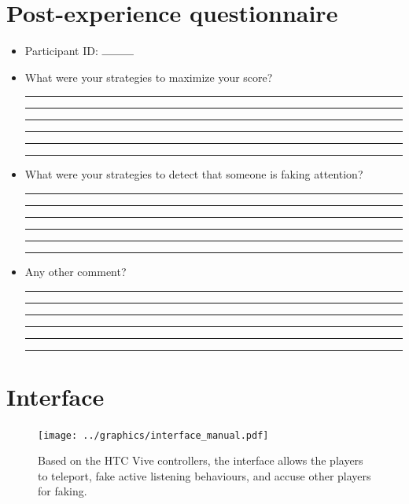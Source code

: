 \documentclass[]{simple-thesis}
\begin{document}
\begin{appendices}
\begin{itemize}
\end{itemize}


\chapter{Post-experience questionnaire}\label{appendix:questionnaire:post}

\begin{itemize}

\item Participant ID: $\rule{1cm}{0.1mm}$

\item What were your strategies to maximize your score?

  \rule{\linewidth}{0.1mm}
  \rule{\linewidth}{0.1mm}
  \rule{\linewidth}{0.1mm}
  \rule{\linewidth}{0.1mm}
  \rule{\linewidth}{0.1mm}
  \rule{\linewidth}{0.1mm}

\item What were your strategies to detect that someone is faking attention?

  \rule{\linewidth}{0.1mm}
  \rule{\linewidth}{0.1mm}
  \rule{\linewidth}{0.1mm}
  \rule{\linewidth}{0.1mm}
  \rule{\linewidth}{0.1mm}
  \rule{\linewidth}{0.1mm}

\item Any other comment?

  \rule{\linewidth}{0.1mm}
  \rule{\linewidth}{0.1mm}
  \rule{\linewidth}{0.1mm}
  \rule{\linewidth}{0.1mm}
  \rule{\linewidth}{0.1mm}
  \rule{\linewidth}{0.1mm}

\end{itemize}


\chapter{Interface}\label{appendix:interface}

\begin{figure}[H]
  \texttt{[image: ../graphics/interface\_manual.pdf]}
  \caption{Based on the HTC Vive controllers, the interface allows the players to teleport, fake active listening behaviours, and accuse other players for faking.}
  \label{fig:interface}
\end{figure}


\end{appendices}
\end{document}
